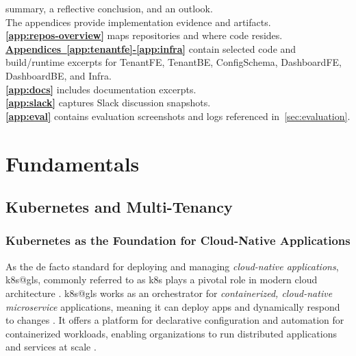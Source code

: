 \documentclass[11pt, a4paper, oneside, listof=totoc]{scrartcl}
\begin{document}
            summary, a reflective conclusion, and an outlook.\\
            The appendices provide implementation evidence and artifacts.\\
            \textbf{\autoref{app:repos-overview}} maps repositories and where code resides.\\
            \textbf{\hyperref[app:tenantfe]{Appendices~\ref*{app:tenantfe}-\ref*{app:infra}}}
            contain selected code and build/runtime excerpts for TenantFE, TenantBE, ConfigSchema,
            DashboardFE, DashboardBE, and Infra.\\
            \textbf{\autoref{app:docs}} includes documentation excerpts.\\
            \textbf{\autoref{app:slack}} captures Slack discussion snapshots.\\
            \textbf{\autoref{app:eval}} contains evaluation screenshots and logs referenced
            in~\autoref{sec:evaluation}.

    \clearpage

    \section{Fundamentals}\label{sec:fundamentals}

        \subsection{Kubernetes and Multi-Tenancy}\label{subsec:k8sAndMultiTenancy}

            \subsubsection{Kubernetes as the Foundation for Cloud-Native Applications}\label{subsubsec:foundationK8s}
                As the de facto standard for deploying and managing 
                \textit{cloud-native applications}, \gls{k8s@gls}, commonly referred to as \gls{k8s}
                plays a pivotal role in modern cloud architecture \parencite[p.~7--8]{poulton2021}.
                \gls{k8s@gls} works as an  orchestrator for \textit{containerized,
                cloud-native microservice} applications, meaning it can deploy apps and dynamically
                respond to changes \parencite[p.~3]{poulton2021}.
                It offers a platform for declarative configuration and automation for containerized
                workloads, enabling organizations to run distributed applications and services at
                scale \parencite{kubernetesOverview,redhatWhatIsKubernetes}.
\end{document}
